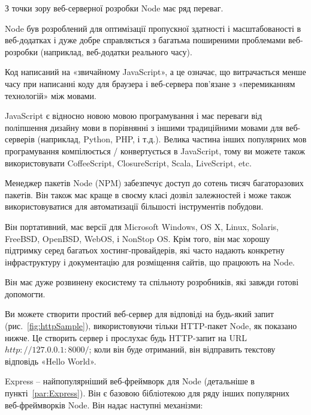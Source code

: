 З точки зору веб-серверної розробки Node має ряд переваг.

Node був розроблений для оптимізації пропускної здатності і масштабованості в веб-додатках і дуже добре справляється з багатьма поширеними проблемами веб-розробки (наприклад, веб-додатки реального часу).

Код написаний на «звичайному JavaScript», а це означає, що витрачається менше часу при написанні коду для браузера і веб-сервера пов'язане з «перемиканням технологій» між мовами.

JavaScript є відносно новою мовою програмування і має переваги від поліпшення дизайну мови в порівнянні з іншими традиційними мовами для веб-серверів (наприклад, Python, PHP, і т.д.). Велика частина інших популярних мов програмування компілюється / конвертується в JavaScript, тому ви можете також використовувати CoffeeScript, ClosureScript, Scala, LiveScript, etc.

Менеджер пакетів Node (NPM) забезпечує доступ до сотень тисяч багаторазових пакетів. Він також має краще в своєму класі дозвіл залежностей і може також використовуватися для автоматизації більшості інструментів побудови.

Він портативний, має версії для Microsoft Windows, OS X, Linux, Solaris, FreeBSD, OpenBSD, WebOS, і NonStop OS. Крім того, він має хорошу підтримку серед багатьох хостинг-провайдерів, які часто надають конкретну інфраструктуру і документацію для розміщення сайтів, що працюють на Node.

Він має дуже розвинену екосистему та спільноту розробників, які завжди готові допомогти.

Ви можете створити простий веб-сервер для відповіді на будь-який запит (рис.~\ref{fig:httpSample}), використовуючи тільки HTTP-пакет Node, як показано нижче. Це створить сервер і прослухає будь HTTP-запит на URL $http://127.0.0.1:8000/$; коли він буде отриманий, він відправить текстову відповідь «Hello World».


Express -- найпопулярніший веб-фреймворк для Node (детальніше в пункті~\ref{par:Express}). Він є базовою бібліотекою для ряду інших популярних веб-фреймворків Node. Він надає наступні механізми:

